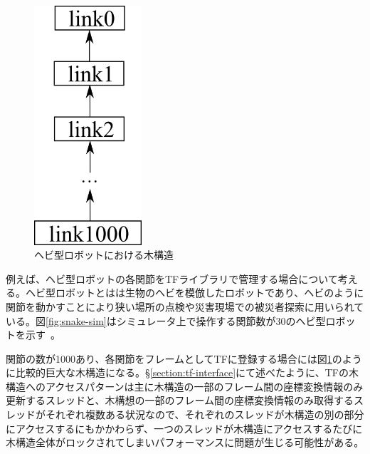\documentclass[a4paper]{jreport}	%
\begin{document}
\begin{figure}[h] 
\centering
\includegraphics[width=4cm]{snake}	
\caption{ヘビ型ロボットにおける木構造}
\label{fig:snake}
\end{figure}


例えば、ヘビ型ロボットの各関節をTFライブラリで管理する場合について考える。ヘビ型ロボットとはは生物のヘビを模倣したロボットであり、ヘビのように関節を動かすことにより狭い場所の点検や災害現場での被災者探索に用いられている。図\ref{fig:snake-sim}はシミュレータ上で操作する関節数が30のヘビ型ロボットを示す~\cite{snake-sim}。

関節の数が1000あり、各関節をフレームとしてTFに登録する場合には図\ref{fig:snake}のように比較的巨大な木構造になる。§\ref{section:tf-interface}にて述べたように、TFの木構造へのアクセスパターンは主に木構造の一部のフレーム間の座標変換情報のみ更新するスレッドと、木構想の一部のフレーム間の座標変換情報のみ取得するスレッドがそれぞれ複数ある状況なので、それぞれのスレッドが木構造の別の部分にアクセスするにもかかわらず、一つのスレッドが木構造にアクセスするたびに木構造全体がロックされてしまいパフォーマンスに問題が生じる可能性がある。
\end{document}

